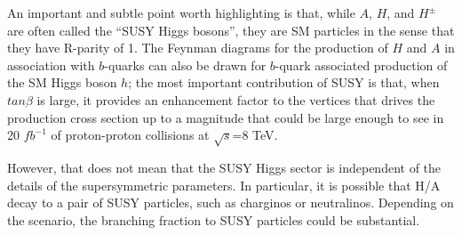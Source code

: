 An important and subtle point worth highlighting is that, while $A$, $H$, and $H^\pm$ are often called the ``SUSY Higgs bosons'', they are SM particles in the sense that they have R-parity of 1.  
The Feynman diagrams for the production of $H$ and $A$ in association with $b$-quarks can also be drawn for $b$-quark associated production of the SM Higgs boson $h$; the most important contribution of SUSY is that, when $tan\beta$ is large, it provides an enhancement factor to the vertices that drives the production cross section up to a magnitude that could be large enough to see in 20 $fb^{-1}$ of proton-proton collisions at $\sqrt{s}$=8 TeV.

However, that does not mean that the SUSY Higgs sector is independent of the details of the supersymmetric parameters.  In particular, it is possible that H/A decay to a pair of SUSY particles, such as charginos or neutralinos.  Depending on the scenario, the branching fraction to SUSY particles could be substantial.  







